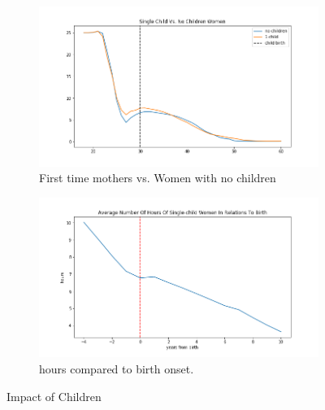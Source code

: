 \begin{figure}[ht]
\begin{subfigure}{.5\textwidth}
    \centering
    \includegraphics[width=1\linewidth]{figures/dqi_single_child_vs_no_child_model1.png}
    \caption{First time mothers vs. Women with no children}
    \label{fig:dqi_model1_child_vs_no_child_30}
\end{subfigure}%
\begin{subfigure}{.5\textwidth}
    \centering
    \includegraphics[width=1\linewidth]{figures/women_supplied_hours_dqi_model1_birth_onset.png}
    \caption{hours compared to birth onset.}
    \label{fig:dqi_model1_birth_onset}
\end{subfigure}
    \caption{Impact of Children}
    \label{fig:model_impact_children}
\end{figure}

